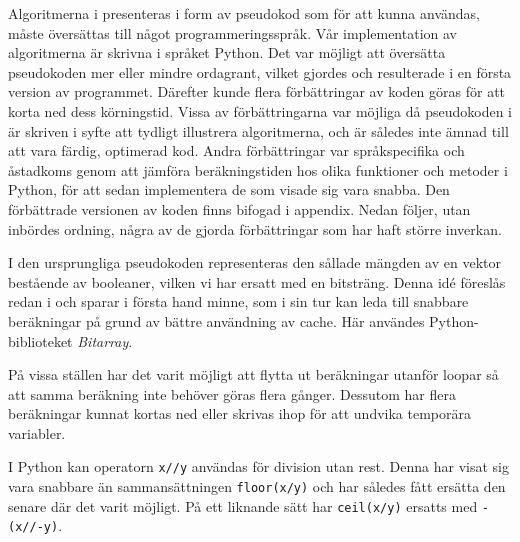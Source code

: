 
Algoritmerna i \cite{HaraldSieve} presenteras i form av pseudokod som för att kunna användas, måste översättas till något programmeringsspråk.
Vår implementation av algoritmerna är skrivna i språket Python.
Det var möjligt att översätta pseudokoden mer eller mindre ordagrant, vilket gjordes och resulterade i en första version av programmet.
Därefter kunde flera förbättringar av koden göras för att korta ned dess körningstid. 
Vissa av förbättringarna var möjliga då pseudokoden i \cite{HaraldSieve} är skriven i syfte att tydligt illustrera algoritmerna,
och är således inte ämnad till att vara färdig, optimerad kod.
Andra förbättringar var språkspecifika och åstadkoms genom att jämföra beräkningstiden hos olika funktioner och metoder i Python, för att sedan implementera de som visade sig vara snabba.
Den förbättrade versionen av koden finns bifogad i appendix.
Nedan följer, utan inbördes ordning, några av de gjorda förbättringar som har haft större inverkan.
\begin{myitemize}
    \item
    I den ursprungliga pseudokoden representeras den sållade mängden av en vektor bestående av booleaner, vilken vi har ersatt med en bitsträng.
    Denna idé föreslås redan i \cite{HaraldSieve} och sparar i första hand minne,
    som i sin tur kan leda till snabbare beräkningar på grund av bättre användning av cache.
    Här användes Python-biblioteket \textit{Bitarray}.
    \item
    På vissa ställen har det varit möjligt att flytta ut beräkningar utanför loopar så att samma beräkning inte behöver göras flera gånger. 
    Dessutom har flera beräkningar kunnat kortas ned eller skrivas ihop för att undvika temporära variabler.
    \item
    I Python kan operatorn \texttt{x//y} användas för division utan rest. Denna har visat sig vara snabbare än sammansättningen \texttt{floor(x/y)} och har således fått ersätta den senare där det varit möjligt. På ett liknande sätt har \texttt{ceil(x/y)} ersatts med \texttt{-(x//-y)}.
\end{myitemize}

